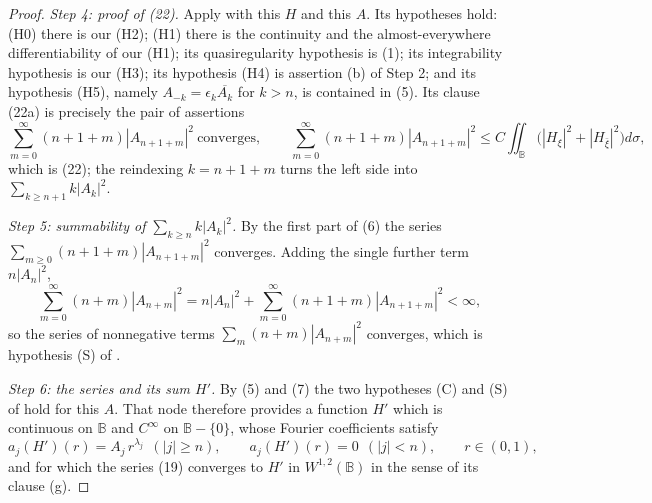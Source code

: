 \begin{proof}
\emph{Step 4: proof of (22).}  Apply  with this $H$ and
this $A$.  Its hypotheses hold: (H0) there is our (H2); (H1) there is the
continuity and the almost-everywhere differentiability of our (H1); its quasiregularity hypothesis is (1);
its integrability hypothesis is our (H3); its hypothesis (H4) is assertion (b)
of Step 2; and its hypothesis (H5), namely $A_{-k}=\epsilon_k\overline{A_k}$
for $k>n$, is contained in (5).  Its clause (22a) is precisely the pair of assertions
\begin{equation}\tag{6}
  \sum_{m=0}^{\infty}(n+1+m)|A_{n+1+m}|^2\ \text{converges},\qquad
  \sum_{m=0}^{\infty}(n+1+m)|A_{n+1+m}|^2
  \le C\iint_{\mathbb{B}}\bigl(|H_\xi|^2+|H_{\bar\xi}|^2\bigr)d\sigma ,
\end{equation}
which is (22); the reindexing $k=n+1+m$ turns the left side into
$\sum_{k\ge n+1}k|A_k|^2$.

\emph{Step 5: summability of $\sum_{k\ge n}k|A_k|^2$.}  By the first part of
(6) the series $\sum_{m\ge0}(n+1+m)|A_{n+1+m}|^2$ converges.  Adding the single
further term $n|A_n|^2$,
\begin{equation}\tag{7}
  \sum_{m=0}^{\infty}(n+m)|A_{n+m}|^2
  =n|A_n|^2+\sum_{m=0}^{\infty}(n+1+m)|A_{n+1+m}|^2<\infty ,
\end{equation}
so the series of nonnegative terms $\sum_{m}(n+m)|A_{n+m}|^2$ converges, which
is hypothesis (S) of .

\emph{Step 6: the series and its sum $H'$.}  By (5) and (7) the two hypotheses
(C) and (S) of  hold for this $A$.  That node
therefore provides a function $H'$ which is continuous on $\mathbb{B}$ and
$C^\infty$ on $\mathbb{B}-\{0\}$, whose Fourier coefficients satisfy
\begin{equation}\tag{8}
  a_j(H')(r)=A_j\,r^{\lambda_j}\ \ (|j|\ge n),\qquad
  a_j(H')(r)=0\ \ (|j|<n),\qquad r\in(0,1),
\end{equation}
and for which the series (19) converges to $H'$ in $W^{1,2}(\mathbb{B})$ in the
sense of its clause (g).


\end{proof}
